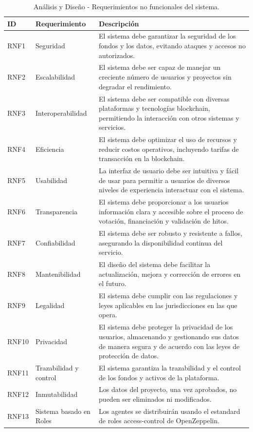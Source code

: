 \begin{table}[H]
\centering
\begin{tabular}{|p{1cm}|p{3cm}|p{10cm}|}
    \hline
    \textbf{ID} & \textbf{Requerimiento} & \textbf{Descripción} \\
    \hline
    RNF1 & Seguridad & El sistema debe garantizar la seguridad de los fondos y los datos, evitando ataques y accesos no autorizados. \\
    \hline
    RNF2 & Escalabilidad & El sistema debe ser capaz de manejar un creciente número de usuarios y proyectos sin degradar el rendimiento. \\
    \hline
    RNF3 & Interoperabilidad & El sistema debe ser compatible con diversas plataformas y tecnologías blockchain, permitiendo la interacción con otros sistemas y servicios. \\
    \hline
    RNF4 & Eficiencia & El sistema debe optimizar el uso de recursos y reducir costos operativos, incluyendo tarifas de transacción en la blockchain. \\
    \hline
    RNF5 & Usabilidad & La interfaz de usuario debe ser intuitiva y fácil de usar para permitir a usuarios de diversos niveles de experiencia interactuar con el sistema. \\
    \hline
    RNF6 & Transparencia & El sistema debe proporcionar a los usuarios información clara y accesible sobre el proceso de votación, financiación y validación de hitos. \\
    \hline
    RNF7 & Confiabilidad & El sistema debe ser robusto y resistente a fallos, asegurando la disponibilidad continua del servicio. \\
    \hline
    RNF8 & Mantenibilidad & El diseño del sistema debe facilitar la actualización, mejora y corrección de errores en el futuro. \\
    \hline
    RNF9 & Legalidad & El sistema debe cumplir con las regulaciones y leyes aplicables en las jurisdicciones en las que opera. \\
    \hline
    RNF10 & Privacidad & El sistema debe proteger la privacidad de los usuarios, almacenando y gestionando sus datos de manera segura y de acuerdo con las leyes de protección de datos. \\
    \hline
    RNF11 & Trazabilidad y control & El sistema garantiza la trazabilidad y el control de los fondos y activos de la plataforma. \\
    \hline
    RNF12 & Inmutabilidad & Los datos del proyecto, una vez aprobados, no pueden ser eliminados ni modificados. \\
    \hline
    RNF13 & Sistema basado en Roles & Los agentes se distribuirán usando el estandard de roles access-control de OpenZeppelin. \\
    \hline
\end{tabular}
\caption{Análisis y Diseño - Requerimientos no funcionales del sistema.}
\label{tab:non_functional_requirements}
\end{table}

